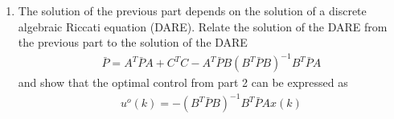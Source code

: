 \begin{enumerate}
    \item
    The solution of the previous part depends on the solution of a discrete algebraic Riccati equation (DARE). Relate the solution of the DARE from the previous part to the solution of the DARE
    \begin{align*}
        \bar{P} = A^T \bar{P} A + C^T C - A^T \bar{P} B (B^T \bar{P} B)^{-1} B^T \bar{P} A
    \end{align*}
    and show that the optimal control from part 2 can be expressed as
    \begin{align*}
        u^o(k) = -(B^T \bar{P} B)^{-1} B^T \bar{P} A x(k)
    \end{align*}

\end{enumerate}
